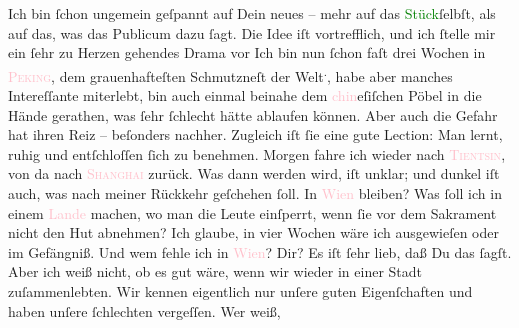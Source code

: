            \pstart
           Ich bin ſchon ungemein geſpannt auf Dein neues \label{K_L02861-23v}\label{K_L02861-23h} – mehr auf das
                  \textcolor{green}{Stück}{}ſelbſt, als auf das, was das Publicum dazu ſagt.
               Die Idee iſt vortrefflich, und ich ſtelle mir ein ſehr zu Herzen gehendes Drama vor{\dotsfive}\pend
           \pstart
           Ich bin nun ſchon faſt drei Wochen in \textsc{\textcolor{pink}{Peking}{}\ledrightnote{\textcolor{pink}{Peking}}}, dem grauenhafteſten Schmutzneſt der Welt\substVorne{}\textsuperscript{.}\substDazwischen{},\substHinten{} habe aber manches Intereſſante miterlebt, bin auch einmal beinahe dem \textcolor{pink}{chin}{}eſiſchen Pöbel in die Hände
               gerathen, was ſehr ſchlecht hätte ablaufen können. Aber auch die Gefahr hat ihren
               Reiz – beſonders \strikeout{\textcolor{gray}{×}\-\textcolor{gray}{×}\-\textcolor{gray}{×}} nachher. Zugleich iſt ſie eine gute Lection: Man lernt, ruhig und entſchloſſen
               ſich zu benehmen. Morgen fahre {\pb}ich wieder nach \textsc{\textcolor{pink}{Tientsin}{}\ledrightnote{\textcolor{pink}{Tianjin}}}, von da nach \textsc{\textcolor{pink}{Shanghai}{}\ledrightnote{\textcolor{pink}{Shanghai}}} zurück. Was dann werden wird, iſt unklar; und dunkel iſt auch, was nach meiner
               Rückkehr geſchehen ſoll. In \textcolor{pink}{Wien}{}\ledrightnote{\textcolor{pink}{Wien}} bleiben? Was ſoll
               ich in einem \textcolor{pink}{Lande}{} machen, wo
               man die Leute einſperrt, wenn ſie vor dem Sakrament nicht den Hut abnehmen? Ich
               glaube, in vier Wochen wäre ich ausgewieſen oder im Gefängniß. Und wem fehle ich in
                  \textcolor{pink}{Wien}{}\ledrightnote{\textcolor{pink}{Wien}}? Dir? Es iſt ſehr lieb, daß Du das ſagſt.
               Aber ich \strikeout{\textcolor{gray}{×}} weiß nicht, ob es gut wäre, wenn wir wieder in einer
               Stadt {\pb}zuſammenlebten. Wir kennen eigentlich nur
               unſere guten Eigenſchaften und haben unſere ſchlechten vergeſſen. Wer weiß, 
